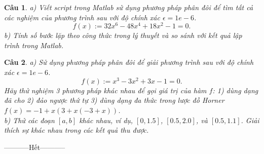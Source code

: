 \documentclass[11pt]{article}
\newtheorem{bt}{Câu}
\begin{document}
\begin{bt}
a) Viết script trong Matlab sử dụng phương pháp phân đôi để tìm tất cả các nghiệm của phương trình sau với độ chính xác $\epsilon=1e-6$.
\[ f(x) := 32x^6 - 48x^4 +18x^2 - 1 = 0.  \] 
b) Tính số bước lặp theo công thức trong lý thuyết và so sánh với kết quả lập trình trong Matlab.
\end{bt}

\begin{bt} %
a) Sử dụng phương pháp phân đôi để giải phương trình sau với độ chính xác $\epsilon=1e-6$. 
%
\[ f(x) := x^3-3x^2+3x-1 = 0. \]
%
Hãy thử nghiệm 3 phương pháp khác nhau để gọi giá trị của hàm $f$: 1) dùng dạng đã cho 2) đảo ngược thứ tự 3) dùng dạng đa thức trong lược đồ Horner $f(x) = -1+x(3+x(-3+x))$. \\
b) Thử các đoạn $[a,b]$ khác nhau, ví dụ, $[0, 1.5]$, $[0.5, 2.0]$, và $[0.5, 1.1]$. Giải thích sự khác nhau trong các kết quả thu được. 
\end{bt}

\centerline{-----------Hết-----------}

% 
   
\end{document}
